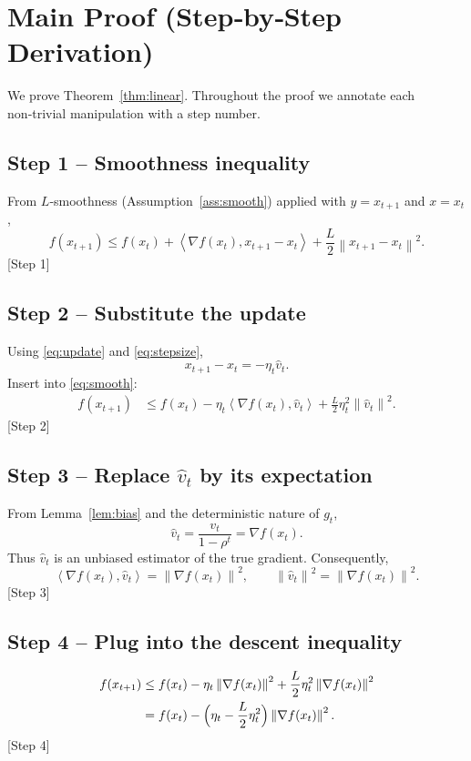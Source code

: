 \documentclass{article}
\newcommand{\norm}[1]{\left\|#1\right\|}
\newcommand{\inner}[2]{\left\langle #1,#2\right\rangle}
\newcommand{\grad}{\nabla}
\begin{document}
\section*{Main Proof (Step‑by‑Step Derivation)}
We prove Theorem~\ref{thm:linear}. Throughout the proof we annotate each non‑trivial manipulation with a step number.

\subsection*{Step 1 – Smoothness inequality}
From $L$‑smoothness (Assumption~\ref{ass:smooth}) applied with $y=x_{t+1}$ and $x=x_t$,
\begin{equation}\label{eq:smooth}
    f(x_{t+1})\le f(x_t)+\inner{\grad f(x_t)}{x_{t+1}-x_t}
    +\frac{L}{2}\norm{x_{t+1}-x_t}^2 .
\end{equation}
[Step 1]

\subsection*{Step 2 – Substitute the update}
Using \eqref{eq:update} and \eqref{eq:stepsize},
\[
    x_{t+1}-x_t = -\eta_t\hat v_t .
\]
Insert into \eqref{eq:smooth}:
\[
\begin{aligned}
    f(x_{t+1}) 
    &\le f(x_t) -\eta_t\inner{\grad f(x_t)}{\hat v_t}
    +\frac{L}{2}\eta_t^{2}\norm{\hat v_t}^{2}.
\end{aligned}
\]
[Step 2]

\subsection*{Step 3 – Replace $\hat v_t$ by its expectation}
From Lemma~\ref{lem:bias} and the deterministic nature of $g_t$,
\[
    \hat v_t = \frac{v_t}{1-\rho^t}= \grad f(x_t) .
\]
Thus $\hat v_t$ is an unbiased estimator of the true gradient. Consequently,
\[
    \inner{\grad f(x_t)}{\hat v_t}= \norm{\grad f(x_t)}^{2},\qquad
    \norm{\hat v_t}^{2}= \norm{\grad f(x_t)}^{2}.
\]
[Step 3]

\subsection*{Step 4 – Plug into the descent inequality}
\[
\begin{aligned}
    f(x_{t+1}) &\le f(x_t)-\eta_t\norm{\grad f(x_t)}^{2}
    +\frac{L}{2}\eta_t^{2}\norm{\grad f(x_t)}^{2}\\
    &= f(x_t) -\Bigl(\eta_t-\frac{L}{2}\eta_t^{2}\Bigr)\norm{\grad f(x_t)}^{2}.
\end{aligned}
\]
[Step 4]
\end{document}
